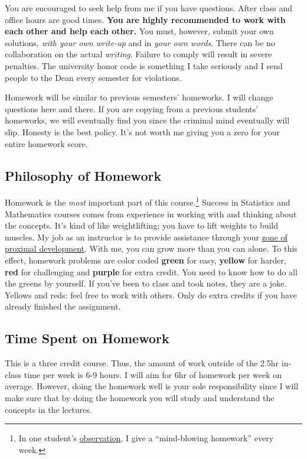\documentclass[12pt]{article}
\newcommand{\ingreen}[1]{\color{green}\textbf{#1} \color{black}}
\newcommand{\inyellow}[1]{\color{yellow}\textbf{#1} \color{black}}
\newcommand{\inred}[1]{\color{red}\textbf{#1} \color{black}}
\newcommand{\inpurple}[1]{\color{purple}\textbf{#1} \color{black}}
\newcommand{\qu}[1]{``#1''}
\begin{document}
You are encouraged to seek help from me if you have questions. After class and office hours are good times. \ingreen{You are highly recommended to work with each other and help each other.} You must, however, submit your own solutions, \textit{with your own write-up} and in \textit{your own words}. There can be no collaboration on the actual \textit{writing}. Failure to comply will result in severe penalties. The university honor code is something I take seriously and I send people to the Dean every semester for violations.

Homework will be similar to previous semesters' homeworks. I will change questions here and there. If you are copying from a previous students' homeworks, we will eventually find you since the criminal mind eventually will slip. Honesty is the best policy. It's not worth me giving you a zero for your entire homework score.

\subsection*{Philosophy of Homework}


Homework is the \textit{most} important part of this course.\footnote{In one student's \href{http://www.ratemyprofessors.com/ShowRatings.jsp?tid=1951051}{observation}, I give a \qu{mind-blowing homework} every week.} Success in Statistics and Mathematics courses comes from experience in working with and thinking about the concepts. It's kind of like weightlifting; you have to lift weights to build muscles. My job as an instructor is to provide assistance through your \href{http://en.wikipedia.org/wiki/Zone_of_proximal_development}{zone of proximal development}. With me, you can grow more than you can alone. To this effect, homework problems are color coded \ingreen{green} for easy, \inyellow{yellow} for harder, \inred{red} for challenging and \inpurple{purple} for extra credit. You need to know how to do all the greens by yourself. If you've been to class and took notes, they are a joke. Yellows and reds: feel free to work with others. Only do extra credits if you have already finished the assignment.

\subsection*{Time Spent on Homework }

This is a three credit course. Thus, the amount of work outside of the 2.5hr in-class time per week is 6-9 hours. I will aim for 6hr of homework per week on average. However, doing the homework well is your sole responsibility since I will make sure that by doing the homework you will study and understand the concepts in the lectures.
\end{document}
